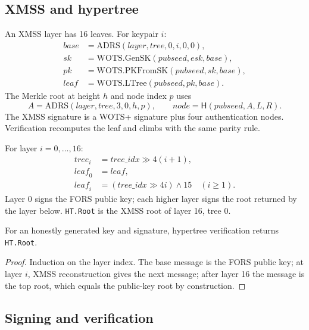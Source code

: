 \documentclass[runningheads]{llncs}
\newcommand{\Hash}{\mathsf{H}}
\begin{document}
\subsection{XMSS and hypertree}

An XMSS layer has 16 leaves.  For keypair $i$:
\[
 \begin{aligned}
 \mathit{base}&=\mathrm{ADRS}(\mathit{layer},\mathit{tree},0,i,0,0),\\
 \mathit{sk}&=\mathrm{WOTS.GenSK}(\mathit{pubseed},\mathit{esk},
   \mathit{base}),\\
 \mathit{pk}&=\mathrm{WOTS.PKFromSK}(\mathit{pubseed},\mathit{sk},
   \mathit{base}),\\
 \mathit{leaf}&=\mathrm{WOTS.LTree}(\mathit{pubseed},\mathit{pk},
   \mathit{base}).
 \end{aligned}
\]
The Merkle root at height $h$ and node index $p$ uses
\[
 A=\mathrm{ADRS}(\mathit{layer},\mathit{tree},3,0,h,p),
 \qquad
 \mathit{node}=\Hash(\mathit{pubseed},A,L,R).
\]
The XMSS signature is a WOTS+ signature plus four authentication
nodes.  Verification recomputes the leaf and climbs with the same
parity rule.

For layer $i=0,\ldots,16$:
\[
\begin{aligned}
 \mathit{tree}_i&=\mathit{tree\_idx}\gg4(i+1),\\
 \mathit{leaf}_0&=\mathit{leaf},\\
 \mathit{leaf}_i&=(\mathit{tree\_idx}\gg4i)\land15
 \quad(i\ge1).
\end{aligned}
\]
Layer 0 signs the FORS public key; each higher layer signs the root
returned by the layer below.  \texttt{HT.Root} is the XMSS root of layer
16, tree 0.

\begin{lemma}
For an honestly generated key and signature, hypertree verification
returns \texttt{HT.Root}.
\end{lemma}

\begin{proof}
Induction on the layer index.  The base message is the FORS public key;
at layer $i$, XMSS reconstruction gives the next message; after layer 16
the message is the top root, which equals the public-key root by
construction.
\end{proof}

\subsection{Signing and verification}
\end{document}

